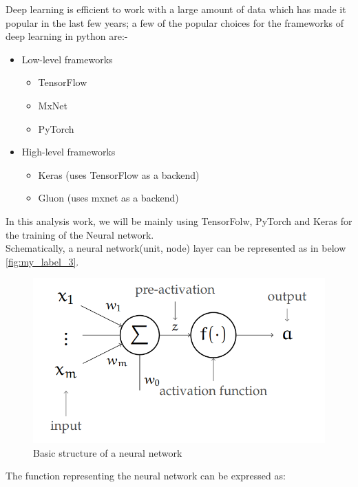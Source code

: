 Deep learning is efficient to work with a large amount of data which has made it popular in the last few years; a few of the popular choices for the frameworks of deep learning in python are:-\\
 \begin{itemize}
     \item Low-level frameworks 
         \begin{itemize}
             \item TensorFlow
             \item MxNet
             \item PyTorch
         \end{itemize}
      \item High-level frameworks
         \begin{itemize}
             \item Keras (uses TensorFlow as a backend)
              \item Gluon (uses mxnet as a backend)
         \end{itemize}
 \end{itemize}
In this analysis work, we will be mainly using TensorFolw, PyTorch and Keras for the training of the Neural network.\\
Schematically, a neural network(unit, node) layer can be represented as in below \autoref{fig:my_label_3}. 
\begin{figure}[H]
    \centering
    \includegraphics[scale =0.5]{Figure/ml__1.png}
    \caption{Basic structure of a neural network\cite{https://doi.org/10.48550/arxiv.1506.00619}}
    \label{fig:my_label_3}
\end{figure}




The function representing the neural network can be expressed as:

